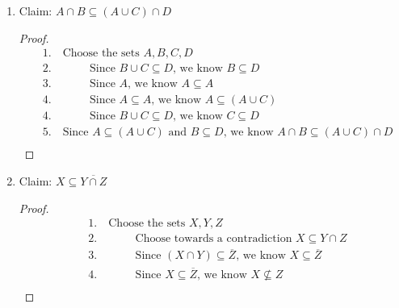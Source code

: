 \documentclass{article}
\begin{document}
\begin{enumerate}
\begin{enumerate}
\begin{proof}
\begin{align*}
                &8. \quad \text{Since all the members of } \{x \mid \frac{x+1}{2} \geq 4\} \text{ are members of } \{x \mid 2x - 2 > 10\} \text{, } \\
                & \quad \text{we know } \{x \mid \frac{x+1}{2} \geq 4\} \subseteq \{x \mid 2x - 2 > 10\}
            \end{align*}
        \end{proof}
        \item Claim: $A \cap B \subseteq (A \cup C) \cap D$
        \begin{proof}
            \begin{align*}
                &1. \quad \text{Choose the sets } A, B, C, D \\
                &2. \quad \hspace{1cm} \text{Since } B \cup C \subseteq D \text{, we know } B \subseteq D \\
                &3. \quad \hspace{1cm} \text{Since } A \text{, we know } A \subseteq A \\
                &4. \quad \hspace{1cm} \text{Since } A \subseteq A \text{, we know } A \subseteq (A \cup C) \\
                &4. \quad \hspace{1cm} \text{Since } B \cup C \subseteq D \text{, we know } C \subseteq D \\
                &5. \quad \text{Since } A \subseteq (A \cup C) \text{ and } B \subseteq D \text{, we know } A \cap B \subseteq (A \cup C) \cap D \\
            \end{align*}
        \end{proof}
        \item Claim: $X \subseteq \overline{Y \cap Z}$
        \begin{proof}
            \begin{align*}
                &1. \quad \text{Choose the sets } X, Y, Z \\
                &2. \quad \hspace{1cm} \text{Choose towards a contradiction } X \subseteq Y \cap Z \\
                &3. \quad \hspace{1cm} \text{Since } (X \cap Y) \subseteq \overline{Z} \text{, we know } X \subseteq \overline{Z} \\
                &4. \quad \hspace{1cm} \text{Since } X \subseteq \overline{Z} \text{, we know } X \nsubseteq Z \\

\end{align*}
\end{proof}
\end{enumerate}
\end{enumerate}
\end{document}

